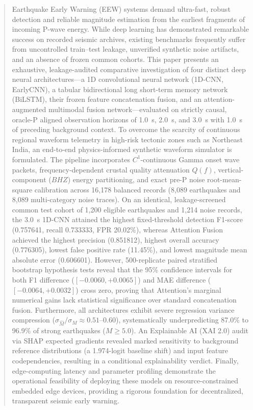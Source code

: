 \documentclass[journal]{IEEEtran}
\begin{document}
\begin{abstract}
Earthquake Early Warning (EEW) systems demand ultra-fast, robust detection and reliable magnitude estimation from the earliest fragments of incoming P-wave energy. While deep learning has demonstrated remarkable success on recorded seismic archives, existing benchmarks frequently suffer from uncontrolled train--test leakage, unverified synthetic noise artifacts, and an absence of frozen common cohorts. This paper presents an exhaustive, leakage-audited comparative investigation of four distinct deep neural architectures---a 1D convolutional neural network (1D-CNN, EarlyCNN), a tabular bidirectional long short-term memory network (BiLSTM), their frozen feature concatenation fusion, and an attention-augmented multimodal fusion network---evaluated on strictly causal, oracle-P aligned observation horizons of 1.0~s, 2.0~s, and 3.0~s with 1.0~s of preceding background context. To overcome the scarcity of continuous regional waveform telemetry in high-risk tectonic zones such as Northeast India, an end-to-end physics-informed synthetic waveform simulator is formulated. The pipeline incorporates $C^1$-continuous Gamma onset wave packets, frequency-dependent crustal quality attenuation $Q(f)$, vertical-component ($BHZ$) energy partitioning, and exact pre-P noise root-mean-square calibration across 16,178 balanced records (8,089 earthquakes and 8,089 multi-category noise traces). On an identical, leakage-screened common test cohort of 1,200 eligible earthquakes and 1,214 noise records, the 3.0~s 1D-CNN attained the highest fixed-threshold detection F1-score (0.757641, recall 0.733333, FPR 20.02\%), whereas Attention Fusion achieved the highest precision (0.851812), highest overall accuracy (0.776305), lowest false positive rate (11.45\%), and lowest magnitude mean absolute error (0.606601). However, 500-replicate paired stratified bootstrap hypothesis tests reveal that the 95\% confidence intervals for both F1 difference ($[-0.0060, +0.0065]$) and MAE difference ($[-0.0064, +0.0032]$) cross zero, proving that Attention's marginal numerical gains lack statistical significance over standard concatenation fusion. Furthermore, all architectures exhibit severe regression variance compression ($\sigma_{\hat{M}}/\sigma_M \approx 0.51$--$0.60$), systematically underpredicting 87.0\% to 96.9\% of strong earthquakes ($M \ge 5.0$). An Explainable AI (XAI 2.0) audit via SHAP expected gradients revealed marked sensitivity to background reference distributions (a 1.974-logit baseline shift) and input feature codependencies, resulting in a conditional explainability verdict. Finally, edge-computing latency and parameter profiling demonstrate the operational feasibility of deploying these models on resource-constrained embedded edge devices, providing a rigorous foundation for decentralized, transparent seismic early warning.
\end{abstract}
\end{document}
